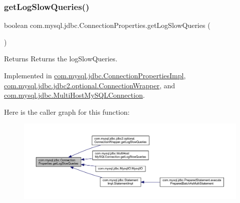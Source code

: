 \subsubsection{\texorpdfstring{get\+Log\+Slow\+Queries()}{getLogSlowQueries()}}
{\footnotesize\ttfamily boolean com.\+mysql.\+jdbc.\+Connection\+Properties.\+get\+Log\+Slow\+Queries (\begin{DoxyParamCaption}{ }\end{DoxyParamCaption})}

\begin{DoxyReturn}{Returns}
Returns the log\+Slow\+Queries. 
\end{DoxyReturn}


Implemented in \mbox{\hyperlink{classcom_1_1mysql_1_1jdbc_1_1_connection_properties_impl_a929bdbe024042ad2fca4b5c9dc6a9fad}{com.\+mysql.\+jdbc.\+Connection\+Properties\+Impl}}, \mbox{\hyperlink{classcom_1_1mysql_1_1jdbc_1_1jdbc2_1_1optional_1_1_connection_wrapper_ad4c40181a8ac4df23cc62cdfa67068ad}{com.\+mysql.\+jdbc.\+jdbc2.\+optional.\+Connection\+Wrapper}}, and \mbox{\hyperlink{classcom_1_1mysql_1_1jdbc_1_1_multi_host_my_s_q_l_connection_afd156080a8f53fbe1f7ff0063f7fa052}{com.\+mysql.\+jdbc.\+Multi\+Host\+My\+S\+Q\+L\+Connection}}.

Here is the caller graph for this function\+:\nopagebreak
\begin{figure}[H]
\begin{center}
\leavevmode
\includegraphics[width=350pt]{interfacecom_1_1mysql_1_1jdbc_1_1_connection_properties_a82c72191f1132e06d2bbe504acde3399_icgraph}
\end{center}
\end{figure}
\mbox{\label{interfacecom_1_1mysql_1_1jdbc_1_1_connection_properties_a55edac0ea8c39a11c087948106b3527c}} 
